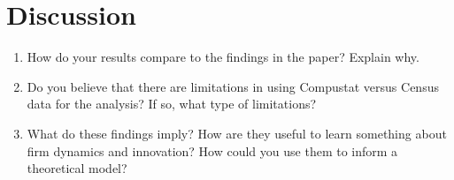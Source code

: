 \documentclass[12pt]{article}
\begin{document}
\section{Discussion}

\begin{enumerate}[leftmargin=0pt, label=\textbf{(\alph*)}]

\item How do your results compare to the findings in the paper? Explain why.

\item Do you believe that there are limitations in using Compustat versus Census data for the analysis? If so, what type of limitations?

\item What do these findings imply? How are they useful to learn something about firm dynamics and innovation? How could you use them to inform a theoretical model?

\end{enumerate}
\end{document}
